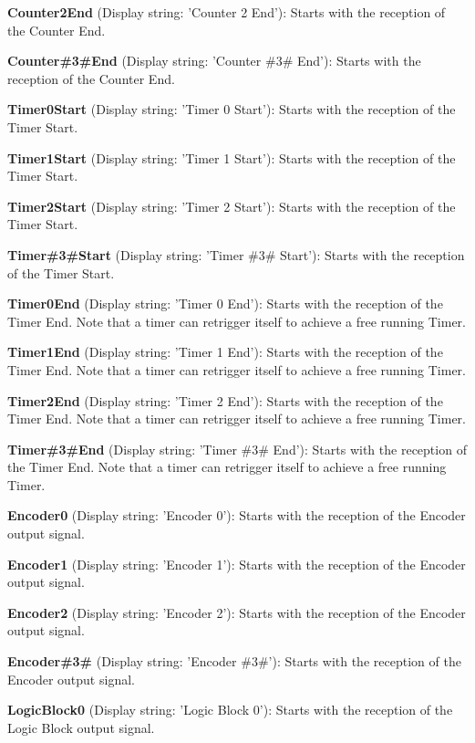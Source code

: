 \begin{DoxyItemize}
\item {\bfseries Counter2\+End} (Display string\+: 'Counter 2 End')\+: Starts with the reception of the Counter End.
\item {\bfseries Counter\#3\#End} (Display string\+: 'Counter \#3\# End')\+: Starts with the reception of the Counter End.
\item {\bfseries Timer0\+Start} (Display string\+: 'Timer 0 Start')\+: Starts with the reception of the Timer Start.
\item {\bfseries Timer1\+Start} (Display string\+: 'Timer 1 Start')\+: Starts with the reception of the Timer Start.
\item {\bfseries Timer2\+Start} (Display string\+: 'Timer 2 Start')\+: Starts with the reception of the Timer Start.
\item {\bfseries Timer\#3\#Start} (Display string\+: 'Timer \#3\# Start')\+: Starts with the reception of the Timer Start.
\item {\bfseries Timer0\+End} (Display string\+: 'Timer 0 End')\+: Starts with the reception of the Timer End. Note that a timer can retrigger itself to achieve a free running Timer.
\item {\bfseries Timer1\+End} (Display string\+: 'Timer 1 End')\+: Starts with the reception of the Timer End. Note that a timer can retrigger itself to achieve a free running Timer.
\item {\bfseries Timer2\+End} (Display string\+: 'Timer 2 End')\+: Starts with the reception of the Timer End. Note that a timer can retrigger itself to achieve a free running Timer.
\item {\bfseries Timer\#3\#End} (Display string\+: 'Timer \#3\# End')\+: Starts with the reception of the Timer End. Note that a timer can retrigger itself to achieve a free running Timer.
\item {\bfseries Encoder0} (Display string\+: 'Encoder 0')\+: Starts with the reception of the Encoder output signal.
\item {\bfseries Encoder1} (Display string\+: 'Encoder 1')\+: Starts with the reception of the Encoder output signal.
\item {\bfseries Encoder2} (Display string\+: 'Encoder 2')\+: Starts with the reception of the Encoder output signal.
\item {\bfseries Encoder\#3\#} (Display string\+: 'Encoder \#3\#')\+: Starts with the reception of the Encoder output signal.
\item {\bfseries Logic\+Block0} (Display string\+: 'Logic Block 0')\+: Starts with the reception of the Logic Block output signal.

\end{DoxyItemize}
